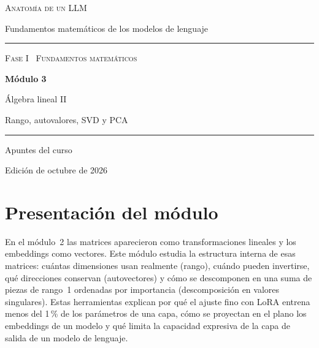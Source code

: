 \documentclass[11pt,a4paper,twoside,openany]{book}
\begin{document}
\frontmatter
\begin{titlepage}
\centering
\vspace*{2.5cm}
{\large\scshape Anatomía de un LLM}\par
\vspace{0.4cm}
{\normalsize Fundamentos matemáticos de los modelos de lenguaje}\par
\vspace{2.2cm}
\rule{\textwidth}{0.8pt}\par\vspace{0.5cm}
{\small\scshape Fase I \textperiodcentered\ Fundamentos matemáticos}\par\vspace{0.3cm}
{\Huge\bfseries Módulo 3\par}\vspace{0.3cm}
{\LARGE Álgebra lineal II\par}\vspace{0.2cm}
{\large Rango, autovalores, SVD y PCA\par}
\vspace{0.5cm}\rule{\textwidth}{0.4pt}\par
\vspace{1.6cm}
{\large Apuntes del curso}\par
\vfill
{\small Edición de octubre de 2026}\par
\end{titlepage}

\chapter*{Presentación del módulo}

En el módulo~2 las matrices aparecieron como transformaciones lineales y los embeddings como vectores. Este módulo estudia la estructura interna de esas matrices: cuántas dimensiones usan realmente (rango), cuándo pueden invertirse, qué direcciones conservan (autovectores) y cómo se descomponen en una suma de piezas de rango~1 ordenadas por importancia (descomposición en valores singulares). Estas herramientas explican por qué el ajuste fino con LoRA entrena menos del 1\,\% de los parámetros de una capa, cómo se proyectan en el plano los embeddings de un modelo y qué limita la capacidad expresiva de la capa de salida de un modelo de lenguaje.
\end{document}
